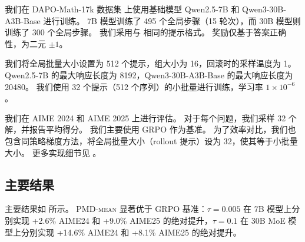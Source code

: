 \documentclass{article}
\theoremstyle{plain}
\theoremstyle{definition}
\theoremstyle{remark}
\begin{document}
我们在 DAPO-Math-17k 数据集 \citep{yu2025dapo} 上使用基础模型 Qwen2.5-7B \citep{qwen2.5} 和 Qwen3-30B-A3B-Base \citep{yang2025qwen3} 进行训练。  
7B 模型训练了 495 个全局步骤（15 轮次），而 30B 模型则训练了 $300$ 个全局步骤。  
我们采用与 \citet{yu2025dapo} 相同的提示格式。  
奖励仅基于答案正确性，为二元 $\pm 1$。 

我们将全局批量大小设置为 512 个提示，组大小为 16，回滚时的采样温度为 1。  
Qwen2.5-7B 的最大响应长度为 8192，Qwen3-30B-A3B-Base 的最大响应长度为 20480。  
我们使用 32 个提示（512 个序列）的小批量进行训练，学习率 $1\times 10^{-6}$。

我们在 AIME 2024 和 AIME 2025 上进行评估。  
对于每个问题，我们采样 32 个解，并报告平均得分。  
我们主要使用 GRPO \citep{shao2024deepseekmath} 作为基准。  
为了效率对比，我们也包含同策略梯度方法，将全局批量大小（rollout 提示）设为 32，使其等于小批量大小。  
更多实现细节见 。 

\subsection{主要结果}
主要结果如  所示。  
\textsc{PMD-mean} 显著优于 GRPO 基准：$\tau=0.005$ 在 7B 模型上分别实现 +2.6\% AIME24 和 +9.0\% AIME25 的绝对提升，$\tau=0.1$ 在 30B MoE 模型上分别实现 +14.6\% AIME24 和 +8.1\% AIME25 的绝对提升。 
\end{document}
